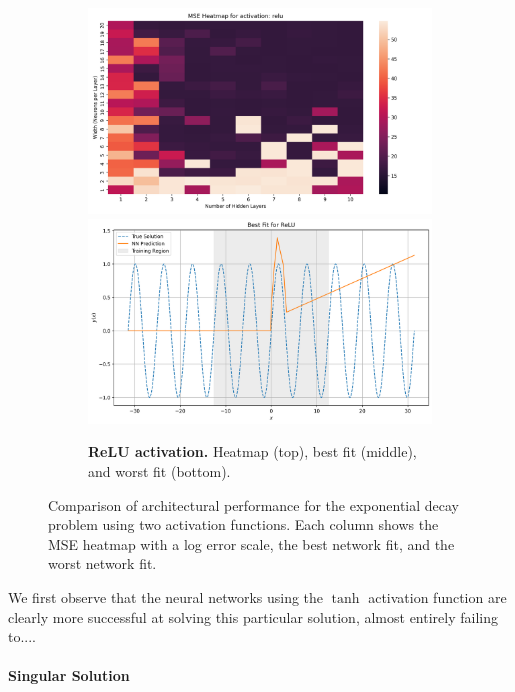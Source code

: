 \begin{figure}[h]
\begin{subfigure}[t]{0.48\textwidth}
        \centering
        \includegraphics[width=\textwidth]{graphics/mse_heatmap_ivp_periodic_relu.png}
        \includegraphics[width=\textwidth]{graphics/ivp_periodic_best_fit_relu_8layers_8width.png}
        \caption{\textbf{ReLU activation.} Heatmap (top), best fit (middle), and worst fit (bottom).}
        \label{fig:ivp_periodic_relu}
    \end{subfigure}
    \hspace*{\fill}
    \caption{Comparison of architectural performance for the exponential decay problem using two 
    activation functions. Each column shows the MSE heatmap with a log error scale,
    the best network fit, and the worst network fit.}
    \label{fig:ivp_periodic_sidebyside}
\end{figure}

We first observe that the neural networks using the $\tanh$ activation function are clearly more
successful at solving this particular solution, almost entirely failing to....


\paragraph{Singular Solution}

